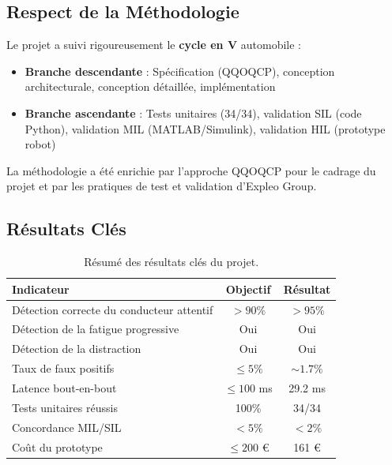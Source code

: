\documentclass[12pt,a4paper,twoside]{report}
\begin{document}
\subsection{Respect de la Méthodologie}

Le projet a suivi rigoureusement le \textbf{cycle en V} automobile :

\begin{itemize}
    \item \textbf{Branche descendante} : Spécification (QQOQCP), conception architecturale, conception détaillée, implémentation
    \item \textbf{Branche ascendante} : Tests unitaires (34/34), validation SIL (code Python), validation MIL (MATLAB/Simulink), validation HIL (prototype robot)
\end{itemize}

La méthodologie a été enrichie par l'approche QQOQCP pour le cadrage du projet et par les pratiques de test et validation d'Expleo Group.

\subsection{Résultats Clés}

\begin{table}[H]
\centering
\caption{Résumé des résultats clés du projet.}
\label{tab:key_results}
\renewcommand{\arraystretch}{1.4}
\begin{tabularx}{\textwidth}{|X|c|c|}
\hline
\rowcolor{stellantisblue!15}
\textbf{Indicateur} & \textbf{Objectif} & \textbf{Résultat} \\
\hline
Détection correcte du conducteur attentif & $> 90\%$ & \cellcolor{green!20} $> 95\%$ \\
\hline
Détection de la fatigue progressive & Oui & \cellcolor{green!20} Oui \\
\hline
Détection de la distraction & Oui & \cellcolor{green!20} Oui \\
\hline
Taux de faux positifs & $\leq 5\%$ & \cellcolor{green!20} $\sim 1.7\%$ \\
\hline
Latence bout-en-bout & $\leq 100$ ms & \cellcolor{green!20} 29.2 ms \\
\hline
Tests unitaires réussis & 100\% & \cellcolor{green!20} 34/34 \\
\hline
Concordance MIL/SIL & $< 5\%$ & \cellcolor{green!20} $< 2\%$ \\
\hline
Coût du prototype & $\leq 200$ € & \cellcolor{green!20} 161 € \\
\hline
\end{tabularx}
\end{table}
\end{document}
